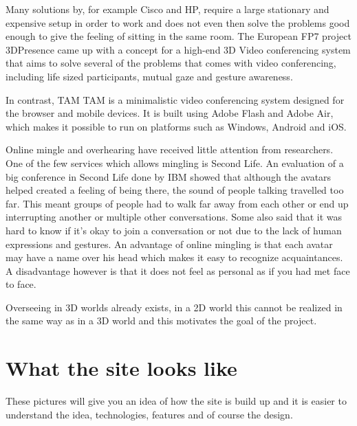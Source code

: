 \documentclass[12pt, titlepage]{article}
\begin{document}
Many solutions by, for example Cisco and HP, require a large stationary and expensive setup in order to work and does not even then solve the problems good enough to give the feeling of sitting in the same room. The European FP7 project 3DPresence\cite{26} came up with a concept for a high-end 3D Video conferencing system that aims to solve several of the problems that comes with video conferencing, including life sized participants, mutual gaze and gesture awareness.

In contrast, TAM TAM\cite{27} is a minimalistic video conferencing system designed for the browser and mobile devices. It is built using Adobe Flash and Adobe Air, which makes it possible to run on platforms such as Windows, Android and iOS.

Online mingle and overhearing have received little attention from researchers. One of the few services which allows mingling is Second Life\cite{5}. An evaluation of a big conference in Second Life done by IBM\cite{1} showed that although the avatars helped created a feeling of being there, the sound of people talking travelled too far. This meant groups of people had to walk far away from each other or end up interrupting another or multiple other conversations. Some also said that it was hard to know if it's okay to join a conversation or not due to the lack of human expressions and gestures. An advantage of online mingling is that each avatar may have a name over his head which makes it easy to recognize acquaintances. A disadvantage however is that it does not feel as personal as if you had met face to face\cite{6}.

Overseeing in 3D worlds already exists\cite{5}\cite{13}\cite{14}\cite{15}, in a 2D world this cannot be realized in the same way as in a 3D world and this motivates the goal of the project.
\section{What the site looks like}
These pictures will give you an idea of how the site is build up and it is easier to understand the idea, technologies, features and of course the design.
\end{document}
